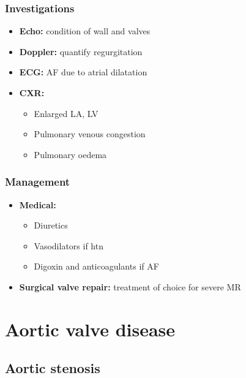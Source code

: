 \documentclass[
  12pt,
]{memoir}
\providecommand{\tightlist}{%
  \setlength{\itemsep}{0pt}\setlength{\parskip}{0pt}}
\begin{document}
\hypertarget{investigations-10}{%
\subsubsection{Investigations}\label{investigations-10}}

\begin{itemize}
\tightlist
\item
  \textbf{Echo:} condition of wall and valves
\item
  \textbf{Doppler:} quantify regurgitation
\item
  \textbf{ECG:} AF due to atrial dilatation
\item
  \textbf{CXR:}

  \begin{itemize}
  \tightlist
  \item
    Enlarged LA, LV
  \item
    Pulmonary venous congestion
  \item
    Pulmonary oedema
  \end{itemize}
\end{itemize}

\hypertarget{management-11}{%
\subsubsection{Management}\label{management-11}}

\begin{itemize}
\tightlist
\item
  \textbf{Medical:}

  \begin{itemize}
  \tightlist
  \item
    Diuretics
  \item
    Vasodilators if htn
  \item
    Digoxin and anticoagulants if AF
  \end{itemize}
\item
  \textbf{Surgical valve repair:} treatment of choice for severe MR
\end{itemize}

\hypertarget{aortic-valve-disease}{%
\section{Aortic valve disease}\label{aortic-valve-disease}}

\hypertarget{aortic-stenosis}{%
\subsection{Aortic stenosis}\label{aortic-stenosis}}
\end{document}
